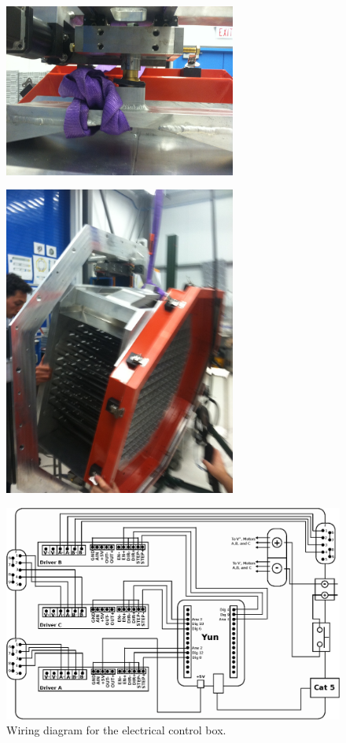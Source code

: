 \documentclass[11pt]{article}
\begin{document}
\begin{figure}[h]
\begin{center}
\includegraphics[width = 3in]{photo_2.png}
\end{center}
\caption{}  
\label{fd1}
\end{figure}


\begin{figure}[h]
\begin{center}
\includegraphics[width = 3in]{photo_3.png}
\end{center}
\caption{}  
\label{fd2}
\end{figure}

\begin{figure}[h]
\begin{center}
\includegraphics[width = 5.5in]{wiringDrawing.eps}
\caption{Wiring diagram for the electrical control box.}  
\label{fd2}
\end{center}
\end{figure}
\end{document}
